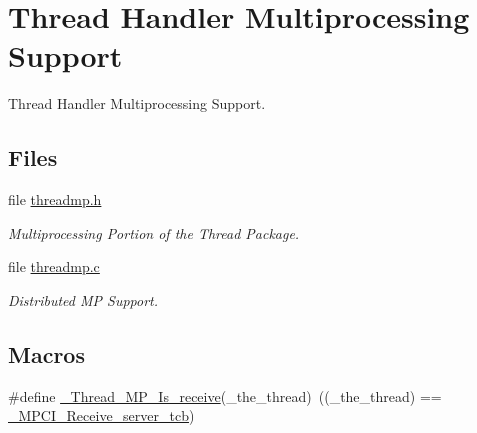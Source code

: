 \hypertarget{group__RTEMSScoreThreadMP}{}\section{Thread Handler Multiprocessing Support}
\label{group__RTEMSScoreThreadMP}


Thread Handler Multiprocessing Support.  


\subsection*{Files}
\begin{DoxyCompactItemize}
\item 
file \mbox{\hyperlink{threadmp_8h}{threadmp.\+h}}
\begin{DoxyCompactList}\small\item\em Multiprocessing Portion of the Thread Package. \end{DoxyCompactList}\item 
file \mbox{\hyperlink{threadmp_8c}{threadmp.\+c}}
\begin{DoxyCompactList}\small\item\em Distributed MP Support. \end{DoxyCompactList}\end{DoxyCompactItemize}
\subsection*{Macros}
\begin{DoxyCompactItemize}
\item 
\#define \mbox{\hyperlink{group__RTEMSScoreThreadMP_ga3e52b743b9616035b9c92ba4f0f37924}{\+\_\+\+Thread\+\_\+\+M\+P\+\_\+\+Is\+\_\+receive}}(\+\_\+the\+\_\+thread)~((\+\_\+the\+\_\+thread) == \mbox{\hyperlink{group__RTEMSScoreMPCI_gac0894f96d2d7e99feb038917fdb3c9cb}{\+\_\+\+M\+P\+C\+I\+\_\+\+Receive\+\_\+server\+\_\+tcb}})
\end{DoxyCompactItemize}
